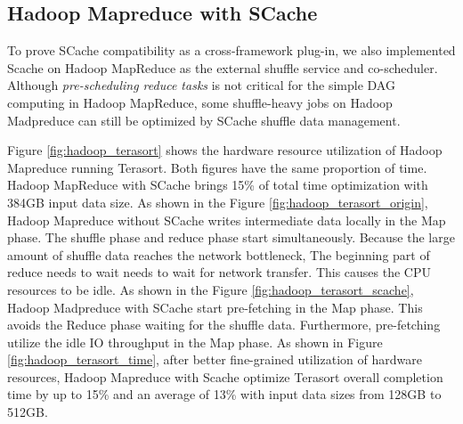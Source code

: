 {\color{blue}
\subsection{Hadoop Mapreduce with SCache}

To prove SCache compatibility as a cross-framework plug-in, we also implemented Scache on Hadoop MapReduce as the external shuffle service and co-scheduler. Although \textit{pre-scheduling reduce tasks} is not critical for the simple DAG computing in Hadoop MapReduce, some shuffle-heavy jobs on Hadoop Madpreduce can still be optimized by SCache shuffle data management.

Figure \ref{fig:hadoop_terasort} shows the hardware resource utilization of Hadoop Mapreduce running Terasort. Both figures have the same proportion of time. Hadoop MapReduce with SCache brings 15\% of total time optimization with 384GB input data size. 
As shown in the Figure \ref{fig:hadoop_terasort_origin}, Hadoop Mapreduce without SCache writes intermediate data locally in the Map phase. The shuffle phase and reduce phase start simultaneously. Because the large amount of shuffle data reaches the network bottleneck, The beginning part of reduce needs to wait needs to wait for network transfer. This causes the CPU resources to be idle. 
As shown in the Figure \ref{fig:hadoop_terasort_scache}, Hadoop Madpreduce with SCache start pre-fetching in the Map phase. This avoids the Reduce phase waiting for the shuffle data. Furthermore, pre-fetching utilize the idle IO throughput in the Map phase. As shown in Figure \ref{fig:hadoop_terasort_time}, after better fine-grained utilization of hardware resources, Hadoop Mapreduce with Scache optimize Terasort overall completion time by up to 15\% and an average of 13\% with input data sizes from 128GB to 512GB.
}

